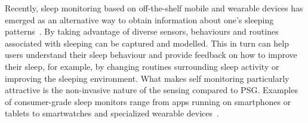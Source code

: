 Recently, sleep monitoring based on off-the-shelf mobile and wearable devices has emerged as an alternative way to obtain information about
one's sleeping patterns~\cite{ko15consumer,shelgikar2016sleep}. By taking advantage of diverse sensors, behaviours and routines associated
with sleeping can be captured and modelled. This in turn can help users understand their sleep behaviour and provide feedback on how to
improve their sleep, for example, by changing routines surrounding sleep activity or improving the sleeping environment. What makes self
monitoring particularly attractive is the non-invasive nature of the sensing compared to PSG. Examples of consumer-grade sleep monitors
range from apps running on smartphones or tablets to smartwatches and specialized wearable
devices~\cite{zeo,Jawbone,SleepAndroid,fitbit,gu2016sleep,sleepmonitor}.


